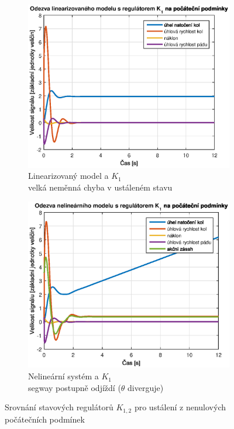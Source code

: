 \documentclass[conference]{IEEEtran}
\begin{document}
\begin{figure}[h!]
    
    \medskip
    
    \centering %
    \begin{subfigure}{0.45\textwidth} 
        \centerline{\includegraphics[width=\linewidth]{stavova_K1_lin.eps}}
        \caption{Linearizovaný model a $K_1$ \\ velká neměnná chyba v ustáleném stavu}
        \label{fig:stavova_K1_lin}        
    \end{subfigure}\hfil
    \centering %
\begin{subfigure}{0.45\textwidth}
    \centerline{\includegraphics[width=\linewidth]{stavova_K1_nelin.eps}}
    \caption{Nelineární systém a $K_1$ \\ segway postupně odjíždí ($\theta$ diverguje)}
    \label{fig:stavova_K1_nelin}        
\end{subfigure}\hfil

\caption{Srovnání stavových regulátorů $K_{1,2}$ pro ustálení z nenulových počátečních podmínek}
\label{fig:charakteristiky}
\end{figure}
\end{document}
